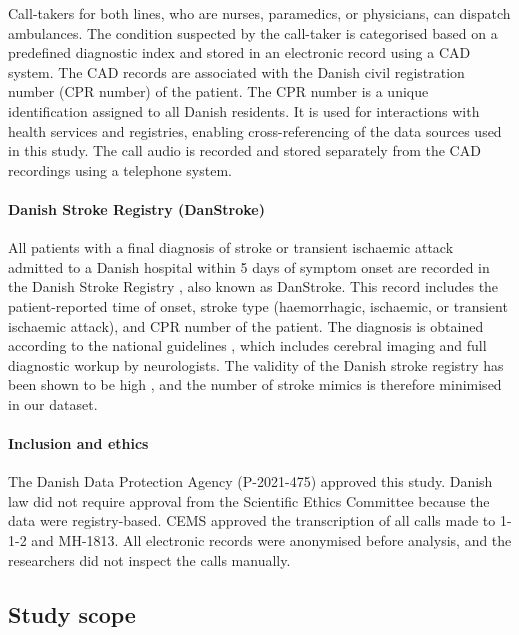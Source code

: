 {Call-takers for both lines, who are nurses, paramedics, or physicians, can dispatch ambulances. The condition suspected by the call-taker is categorised based on a predefined diagnostic index and stored in an electronic record using a CAD system. The CAD records are associated with the Danish civil registration number (CPR number) \parencite{cite19} of the patient. The CPR number is a unique identification assigned to all Danish residents. It is used for interactions with health services and registries, enabling cross-referencing of the data sources used in this study. The call audio is recorded and stored separately from the CAD recordings using a telephone system.

\paragraph{Danish Stroke Registry (DanStroke)}

All patients with a final diagnosis of stroke or transient ischaemic attack admitted to a Danish hospital within 5 days of symptom onset are recorded in the Danish Stroke Registry \parencite{cite16}, also known as DanStroke. This record includes the patient-reported time of onset, stroke type (haemorrhagic, ischaemic, or transient ischaemic attack), and CPR number of the patient.
The diagnosis is obtained according to the national guidelines \parencite{baluenfeldt_national_2021}, which includes cerebral imaging and full diagnostic workup by neurologists. The validity of the Danish stroke registry has been shown to be high \parencite{wildenschild_registration_2013}, and the number of stroke mimics is therefore minimised in our dataset.


\paragraph{Inclusion and ethics}

The Danish Data Protection Agency (P-2021-475) approved this study. Danish law did not require approval from the Scientific Ethics Committee because the data were registry-based. CEMS approved the transcription of all calls made to 1-1-2 and MH-1813. All electronic records were anonymised before analysis, and the researchers did not inspect the calls manually.


\subsection{Study scope}

}
